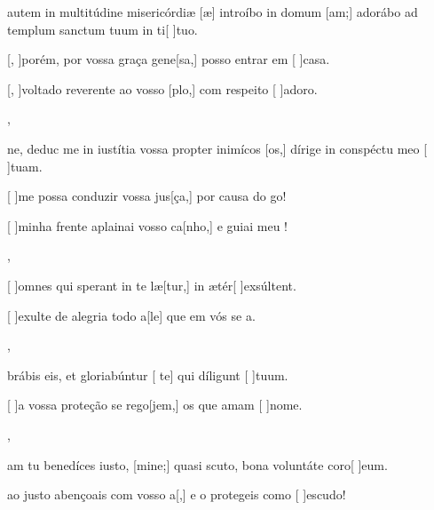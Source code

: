 {  {\item {} autem in multitúdine misericórdiæ [æ] introíbo in domum [am;] adorábo ad templum sanctum tuum in ti[ ]{tu}o.~\Antiphona}%
    {\item {}[, ]{po}rém, por vossa graça gene[sa,] posso entrar em [ ]{ca}sa.~\Antiphona
      \item {}[, ]{vol}tado reverente ao vosso [plo,] com respeito [ ]{a}{do}ro.~\Antiphona},
  {\item {}ne, deduc me in iustítia vossa propter inimícos [os,] dírige in conspéctu meo [ ]tuam.~\Antiphona}%
    {\item {}[ ]{me} possa conduzir vossa jus[ça,] por causa do go!~\Antiphona
      \item {}[ ]{mi}nha frente aplainai vosso ca[\-nho,] e guiai meu !~\Antiphona},
  {\item {}[ ]{om}nes qui sperant in te læ[tur,] in ætér[ ]{ex}{súl}\-tent.~\Antiphona}%
    {\item {}[ ]{e}xulte de alegria todo a[le] que em vós se a.~\Antiphona},
  {\item {}brábis eis, et gloriabúntur [ te] qui díligunt [ ]{tu}um.~\Antiphona}%
    {\item {}[ ]{a} vossa proteção se rego[jem,] os que amam [ ]{no}me.~\Antiphona},
  {\item {}am tu benedíces iusto, [mine;] quasi scuto, bona voluntáte coro[ ]{e}um.~\Antiphona}%
    {\item {} ao justo abençoais com vosso a[,] e o protegeis como [ ]{es}{cu}do!~\Antiphona}
}